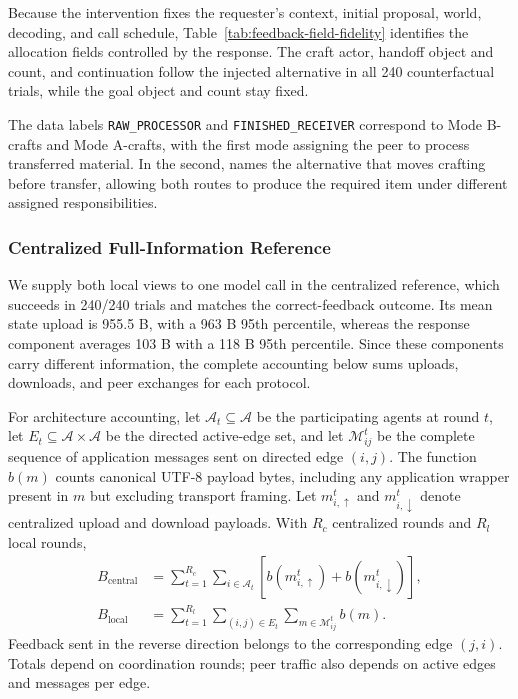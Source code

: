 \documentclass[sigconf,nonacm,balance=false]{aamas}
\begin{document}
Because the intervention fixes the requester's context, initial proposal, world, decoding, and call schedule, Table~\ref{tab:feedback-field-fidelity} identifies the allocation fields controlled by the response. The craft actor, handoff object and count, and continuation follow the injected alternative in all 240 counterfactual trials, while the goal object and count stay fixed.

The data labels \texttt{RAW\_PROCESSOR} and \texttt{FINISHED\_RECEIVER} correspond to Mode B-crafts and Mode A-crafts, with the first mode assigning the peer to process transferred material. In the second, \allowbreak{} names the alternative that moves crafting before transfer, allowing both routes to produce the required item under different assigned responsibilities.

\subsubsection{Centralized Full-Information Reference}

We supply both local views to one model call in the centralized reference, which succeeds in 240/240 trials and matches the correct-feedback outcome. Its mean state upload is 955.5 B, with a 963 B 95th percentile, whereas the response component averages 103 B with a 118 B 95th percentile. Since these components carry different information, the complete accounting below sums uploads, downloads, and peer exchanges for each protocol.

\begin{samepage}
For architecture accounting, let $\mathcal A_t\subseteq\mathcal A$ be the participating agents at round $t$, let $E_t\subseteq\mathcal A\times\mathcal A$ be the directed active-edge set, and let $\mathcal M_{ij}^t$ be the complete sequence of application messages sent on directed edge $(i,j)$. The function $b(m)$ counts canonical UTF-8 payload bytes, including any application wrapper present in $m$ but excluding transport framing. Let $m_{i,\uparrow}^{t}$ and $m_{i,\downarrow}^{t}$ denote centralized upload and download payloads. With $R_c$ centralized rounds and $R_l$ local rounds,
\begin{align}
B_{\mathrm{central}}
  &= \sum_{t=1}^{R_c}\sum_{i\in\mathcal A_t}
     \left[b(m_{i,\uparrow}^{t})+b(m_{i,\downarrow}^{t})\right], \\
B_{\mathrm{local}}
  &= \sum_{t=1}^{R_l}\sum_{(i,j)\in E_t}
     \sum_{m\in\mathcal M_{ij}^{t}} b(m).
\end{align}
Feedback sent in the reverse direction belongs to the corresponding edge $(j,i)$. Totals depend on coordination rounds; peer traffic also depends on active edges and messages per edge.
\end{samepage}
\end{document}

